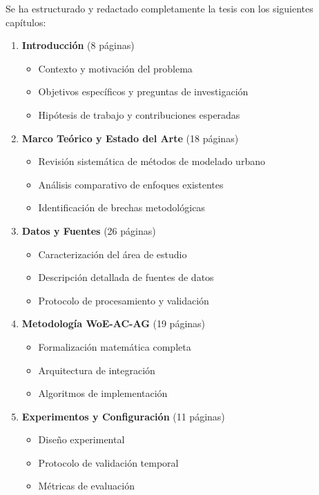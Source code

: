 \documentclass[12pt,letterpaper]{article}
\begin{document}
Se ha estructurado y redactado completamente la tesis con los siguientes capítulos:

\begin{enumerate}
\item \textbf{Introducción} (8 páginas)
    \begin{itemize}
    \item Contexto y motivación del problema
    \item Objetivos específicos y preguntas de investigación
    \item Hipótesis de trabajo y contribuciones esperadas
    \end{itemize}

\item \textbf{Marco Teórico y Estado del Arte} (18 páginas)
    \begin{itemize}
    \item Revisión sistemática de métodos de modelado urbano
    \item Análisis comparativo de enfoques existentes
    \item Identificación de brechas metodológicas
    \end{itemize}

\item \textbf{Datos y Fuentes} (26 páginas)
    \begin{itemize}
    \item Caracterización del área de estudio
    \item Descripción detallada de fuentes de datos
    \item Protocolo de procesamiento y validación
    \end{itemize}

\item \textbf{Metodología WoE-AC-AG} (19 páginas)
    \begin{itemize}
    \item Formalización matemática completa
    \item Arquitectura de integración
    \item Algoritmos de implementación
    \end{itemize}

\item \textbf{Experimentos y Configuración} (11 páginas)
    \begin{itemize}
    \item Diseño experimental
    \item Protocolo de validación temporal
    \item Métricas de evaluación
    \end{itemize}


\end{enumerate}
\end{document}

